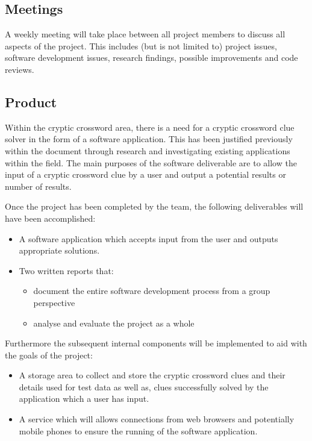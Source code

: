 \subsection{Meetings}

A weekly meeting will take place between all project members to discuss all
aspects of the project. This includes (but is not limited to) project issues,
software development issues, research findings, possible improvements and code
reviews.


\subsection{Product}

Within the cryptic crossword area, there is a need for a cryptic crossword clue
solver in the form of a software application.  This has been justified
previously within the document through research and investigating existing
applications within the field. The main purposes of the software deliverable are
to allow the input of a cryptic crossword clue by a user and output a potential 
results or number of results.

Once the project has been completed by the team, the following deliverables will
have been accomplished:

\begin{itemize}
  \item A software application which accepts input from the user and outputs 
        appropriate solutions. 
  \item Two written reports that:
    \begin{itemize}
      \item document the entire software development process from a group 
            perspective
      \item analyse and evaluate the project as a whole
    \end{itemize}
\end{itemize}

Furthermore the subsequent internal components will be implemented to aid with 
the goals of the project:

\begin{itemize}
  \item A storage area to collect and store the cryptic crossword clues and 
        their details used for test data as well as, clues successfully solved 
        by the application which a user has input.
  \item A service which will allows connections from web browsers and 
        potentially mobile phones to ensure the running of the software 
        application.
\end{itemize}

